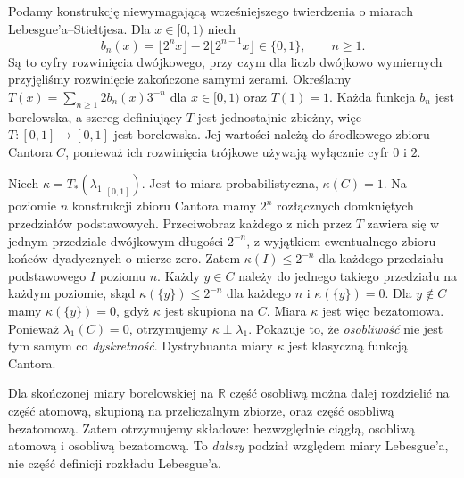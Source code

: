 \begin{przyklad}
\label{ex:cantor-measure-17}
Podamy konstrukcję niewymagającą wcześniejszego twierdzenia
o miarach Lebesgue'a--Stieltjesa. Dla $x\in[0,1)$ niech
\[
b_n(x)=\lfloor2^nx\rfloor-2\lfloor2^{n-1}x\rfloor\in\{0,1\},
\qquad n\ge1.
\]
Są to cyfry rozwinięcia dwójkowego, przy czym dla liczb
dwójkowo wymiernych przyjęliśmy rozwinięcie zakończone
samymi zerami. Określamy
$T(x)=\sum_{n\ge1}2b_n(x)3^{-n}$ dla $x\in[0,1)$
oraz $T(1)=1$. Każda funkcja $b_n$ jest borelowska,
a szereg definiujący $T$ jest jednostajnie zbieżny,
więc $T:[0,1]\to[0,1]$ jest borelowska. Jej wartości
należą do środkowego zbioru Cantora $C$, ponieważ ich
rozwinięcia trójkowe używają wyłącznie cyfr $0$ i $2$.

Niech $\kappa=T_*(\lambda_1|_{[0,1]})$. Jest to miara
probabilistyczna, $\kappa(C)=1$. Na poziomie $n$
konstrukcji zbioru Cantora mamy $2^n$ rozłącznych
domkniętych przedziałów podstawowych. Przeciwobraz
każdego z nich przez $T$ zawiera się w jednym przedziale
dwójkowym długości $2^{-n}$, z wyjątkiem ewentualnego
zbioru końców dyadycznych o mierze zero. Zatem
$\kappa(I)\le2^{-n}$ dla każdego przedziału podstawowego
$I$ poziomu $n$. Każdy $y\in C$ należy do jednego
takiego przedziału na każdym poziomie, skąd
$\kappa(\{y\})\le2^{-n}$ dla każdego $n$ i
$\kappa(\{y\})=0$. Dla $y\notin C$ mamy
$\kappa(\{y\})=0$, gdyż $\kappa$ jest skupiona na $C$.
Miara $\kappa$ jest więc bezatomowa. Ponieważ
$\lambda_1(C)=0$, otrzymujemy $\kappa\perp\lambda_1$.
Pokazuje to, że \emph{osobliwość} nie jest tym samym co
\emph{dyskretność}. Dystrybuanta miary $\kappa$ jest
klasyczną funkcją Cantora.
\end{przyklad}

\begin{uwaga}
Dla skończonej miary borelowskiej na $\mathbb R$ część
osobliwą można dalej rozdzielić na część atomową,
skupioną na przeliczalnym zbiorze, oraz część osobliwą
bezatomową. Zatem otrzymujemy składowe: bezwzględnie
ciągłą, osobliwą atomową i osobliwą bezatomową.
To \emph{dalszy} podział względem miary Lebesgue'a,
nie część definicji rozkładu Lebesgue'a.
\end{uwaga}

